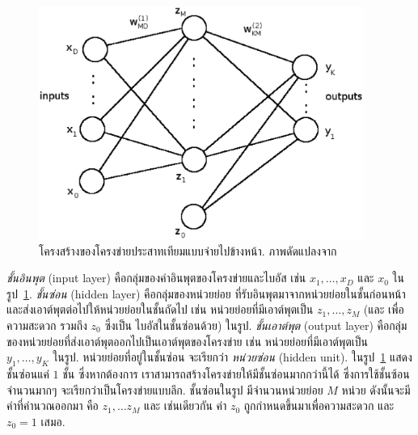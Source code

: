 %
\begin{figure}
\begin{center}
\includegraphics[height=3in]{04ANN/ANNetwork.eps}
\end{center}
\caption{โครงสร้างของโครงข่ายประสาทเทียมแบบจ่ายไปข้างหน้า. {\footnotesize ภาพดัดแปลงจาก\cite{Bishop2006a}}}
\label{fig: ANN feed-forward structure}
\end{figure}
%

\textit{ชั้นอินพุต} (input layer) คือกลุ่มของค่าอินพุตของโครงข่ายและไบอัส เช่น $x_1, \ldots, x_D$ และ $x_0$ ในรูป~\ref{fig: ANN feed-forward structure}.
\textit{ชั้นซ่อน} (hidden layer) คือกลุ่มของหน่วยย่อย ที่รับอินพุตมาจากหน่วยย่อยในชั้นก่อนหน้า 
และส่งเอาต์พุตต่อไปให้หน่วยย่อยในชั้นถัดไป เช่น หน่วยย่อยที่มีเอาต์พุตเป็น $z_1, \ldots, z_M$ (และ เพื่อความสะดวก รวมถึง $z_0$ ซึ่งเป็น ไบอัสในชั้นซ่อนด้วย) ในรูป.
\textit{ชั้นเอาต์พุต} (output layer) คือกลุ่มของหน่วยย่อยที่ส่งเอาต์พุตออกไปเป็นเอาต์พุตของโครงข่าย เช่น หน่วยย่อยที่มีเอาต์พุตเป็น $y_1, \ldots, y_K$ ในรูป.
หน่วยย่อยที่อยู่ในชั้นซ่อน จะเรียกว่า \textit{หน่วยซ่อน} (hidden unit).
ในรูป~\ref{fig: ANN feed-forward structure} แสดงชั้นซ่อนแค่ $1$ ชั้น ซึ่งหากต้องการ เราสามารถสร้างโครงข่ายให้มีชั้นซ่อนมากกว่านี้ได้ ซึ่งการใช้ชั้นซ้อนจำนวนมากๆ จะเรียกว่าเป็นโครงข่ายแบบลึก.
ชั้นซ่อนในรูป มีจำนวนหน่วยย่อย $M$ หน่วย ดังนั้นจะมีค่าที่คำนวณออกมา คือ $z_1, \ldots z_M$ และ เช่นเดียวกัน ค่า $z_0$ ถูกกำหนดขึ้นมาเพื่อความสะดวก และ $z_0 = 1$ เสมอ.


